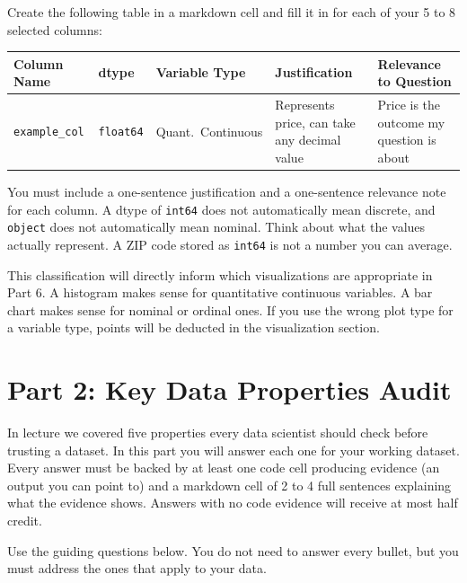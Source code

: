 \documentclass[11pt,letterpaper]{article}
\newcommand{\code}[1]{\texttt{#1}}
\begin{document}
Create the following table in a markdown cell and fill it in for each of your 5 to 8 selected columns:

\begin{center}
\small
\begin{tabularx}{\textwidth}{@{}>{\raggedright\arraybackslash}p{2.3cm} l >{\raggedright\arraybackslash}p{2.3cm} >{\raggedright\arraybackslash}X >{\raggedright\arraybackslash}X@{}}
\toprule
\textbf{Column Name} & \textbf{dtype} & \textbf{Variable Type} & \textbf{Justification} & \textbf{Relevance to Question} \\
\midrule
\code{example\_col} & \code{float64} & Quant.\ Continuous & Represents price, can take any decimal value & Price is the outcome my question is about \\
\bottomrule
\end{tabularx}
\end{center}

You must include a one-sentence justification and a one-sentence relevance note for each column. A dtype of \code{int64} does not automatically mean discrete, and \code{object} does not automatically mean nominal. Think about what the values actually represent. A ZIP code stored as \code{int64} is not a number you can average.

This classification will directly inform which visualizations are appropriate in Part 6. A histogram makes sense for quantitative continuous variables. A bar chart makes sense for nominal or ordinal ones. If you use the wrong plot type for a variable type, points will be deducted in the visualization section.

\section{Part 2: Key Data Properties Audit}

In lecture we covered five properties every data scientist should check before trusting a dataset. In this part you will answer each one for your working dataset. Every answer must be backed by at least one code cell producing evidence (an output you can point to) and a markdown cell of 2 to 4 full sentences explaining what the evidence shows. Answers with no code evidence will receive at most half credit.

Use the guiding questions below. You do not need to answer every bullet, but you must address the ones that apply to your data.
\end{document}
